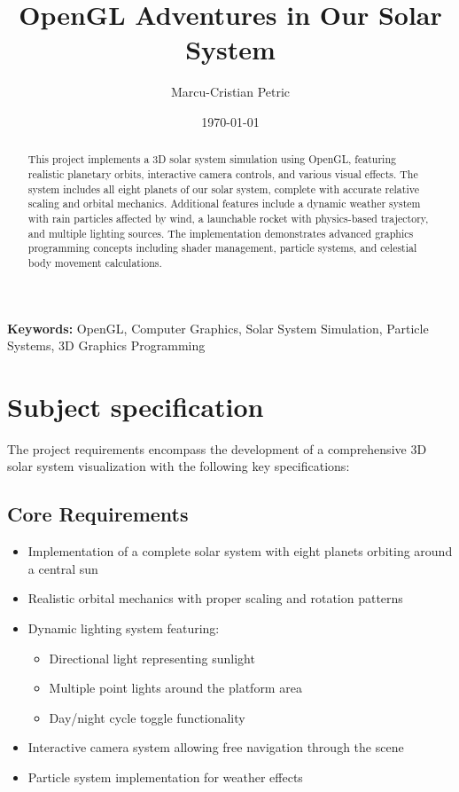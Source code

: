 \documentclass[12pt]{report}
\title{OpenGL Adventures in Our Solar System}
\author{Marcu-Cristian Petric}
\affil{Technical University of Cluj-Napoca}
\date{\today}
\begin{document}
\maketitle

\begin{abstract}
This project implements a 3D solar system simulation using OpenGL\cite{opengl_programming}, featuring realistic planetary orbits, interactive camera controls, and various visual effects. The system includes all eight planets of our solar system, complete with accurate relative scaling and orbital mechanics. Additional features include a dynamic weather system with rain particles affected by wind, a launchable rocket with physics-based trajectory, and multiple lighting sources. The implementation demonstrates advanced graphics programming concepts including shader management, particle systems, and celestial body movement calculations.
\end{abstract}
\textbf{Keywords:} OpenGL, Computer Graphics, Solar System Simulation, Particle Systems, 3D Graphics Programming


\begingroup
{}
\tableofcontents
\endgroup

\chapter{Subject specification}

The project requirements encompass the development of a comprehensive 3D solar system visualization with the following key specifications:

\section{Core Requirements}
\begin{itemize}
    \item Implementation of a complete solar system with eight planets orbiting around a central sun
    \item Realistic orbital mechanics with proper scaling and rotation patterns
    \item Dynamic lighting system featuring:
        \begin{itemize}
            \item Directional light representing sunlight
            \item Multiple point lights around the platform area
            \item Day/night cycle toggle functionality
        \end{itemize}
    \item Interactive camera system allowing free navigation through the scene
    \item Particle system implementation for weather effects
\end{itemize}
\end{document}
